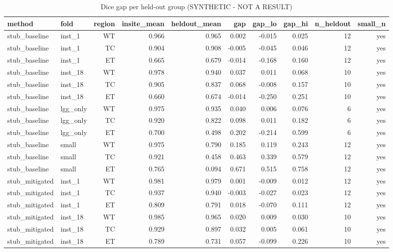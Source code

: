 \begin{table}[t]
\centering
\caption{Dice gap per held-out group (SYNTHETIC - NOT A RESULT)}
\label{tab:gap}
\begin{tabular}{llrrrrrrrr}
\hline
method & fold & region & insite\_mean & heldout\_mean & gap & gap\_lo & gap\_hi & n\_heldout & small\_n \\
\hline
stub\_baseline & inst\_1 & WT & 0.966 & 0.965 & 0.002 & -0.015 & 0.025 & 12 & yes \\
stub\_baseline & inst\_1 & TC & 0.904 & 0.908 & -0.005 & -0.045 & 0.046 & 12 & yes \\
stub\_baseline & inst\_1 & ET & 0.665 & 0.679 & -0.014 & -0.168 & 0.160 & 12 & yes \\
stub\_baseline & inst\_18 & WT & 0.978 & 0.940 & 0.037 & 0.011 & 0.068 & 10 & yes \\
stub\_baseline & inst\_18 & TC & 0.905 & 0.837 & 0.068 & -0.008 & 0.157 & 10 & yes \\
stub\_baseline & inst\_18 & ET & 0.660 & 0.674 & -0.014 & -0.250 & 0.251 & 10 & yes \\
stub\_baseline & lgg\_only & WT & 0.975 & 0.935 & 0.040 & 0.006 & 0.076 & 6 & yes \\
stub\_baseline & lgg\_only & TC & 0.920 & 0.822 & 0.098 & 0.011 & 0.182 & 6 & yes \\
stub\_baseline & lgg\_only & ET & 0.700 & 0.498 & 0.202 & -0.214 & 0.599 & 6 & yes \\
stub\_baseline & small & WT & 0.975 & 0.790 & 0.185 & 0.119 & 0.243 & 12 & yes \\
stub\_baseline & small & TC & 0.921 & 0.458 & 0.463 & 0.339 & 0.579 & 12 & yes \\
stub\_baseline & small & ET & 0.765 & 0.094 & 0.671 & 0.515 & 0.758 & 12 & yes \\
stub\_mitigated & inst\_1 & WT & 0.981 & 0.979 & 0.001 & -0.009 & 0.012 & 12 & yes \\
stub\_mitigated & inst\_1 & TC & 0.937 & 0.940 & -0.003 & -0.027 & 0.023 & 12 & yes \\
stub\_mitigated & inst\_1 & ET & 0.809 & 0.791 & 0.018 & -0.070 & 0.111 & 12 & yes \\
stub\_mitigated & inst\_18 & WT & 0.985 & 0.965 & 0.020 & 0.009 & 0.030 & 10 & yes \\
stub\_mitigated & inst\_18 & TC & 0.929 & 0.897 & 0.032 & 0.005 & 0.061 & 10 & yes \\
stub\_mitigated & inst\_18 & ET & 0.789 & 0.731 & 0.057 & -0.099 & 0.226 & 10 & yes \\

\end{tabular}
\end{table}
